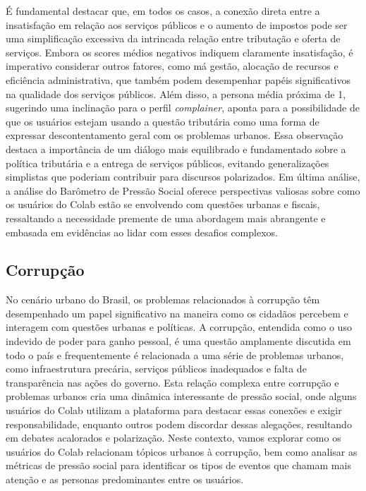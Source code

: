 É fundamental destacar que, em todos os casos, a conexão direta entre a insatisfação em relação aos serviços públicos e o aumento de impostos pode ser uma simplificação excessiva da intrincada relação entre tributação e oferta de serviços. Embora os scores médios negativos indiquem claramente insatisfação, é imperativo considerar outros fatores, como má gestão, alocação de recursos e eficiência administrativa, que também podem desempenhar papéis significativos na qualidade dos serviços públicos. Além disso, a persona média próxima de 1, sugerindo uma inclinação para o perfil \textit{complainer}, aponta para a possibilidade de que os usuários estejam usando a questão tributária como uma forma de expressar descontentamento geral com os problemas urbanos. Essa observação destaca a importância de um diálogo mais equilibrado e fundamentado sobre a política tributária e a entrega de serviços públicos, evitando generalizações simplistas que poderiam contribuir para discursos polarizados. Em última análise, a análise do Barômetro de Pressão Social oferece perspectivas valiosas sobre como os usuários do Colab estão se envolvendo com questões urbanas e fiscais, ressaltando a necessidade premente de uma abordagem mais abrangente e embasada em evidências ao lidar com esses desafios complexos.

\subsection{Corrupção}

No cenário urbano do Brasil, os problemas relacionados à corrupção têm desempenhado um papel significativo na maneira como os cidadãos percebem e interagem com questões urbanas e políticas. A corrupção, entendida como o uso indevido de poder para ganho pessoal, é uma questão amplamente discutida em todo o país e frequentemente é relacionada a uma série de problemas urbanos, como infraestrutura precária, serviços públicos inadequados e falta de transparência nas ações do governo. Esta relação complexa entre corrupção e problemas urbanos cria uma dinâmica interessante de pressão social, onde alguns usuários do Colab utilizam a plataforma para destacar essas conexões e exigir responsabilidade, enquanto outros podem discordar dessas alegações, resultando em debates acalorados e polarização. Neste contexto, vamos explorar como os usuários do Colab relacionam tópicos urbanos à corrupção, bem como analisar as métricas de pressão social para identificar os tipos de eventos que chamam mais atenção e as personas predominantes entre os usuários.

